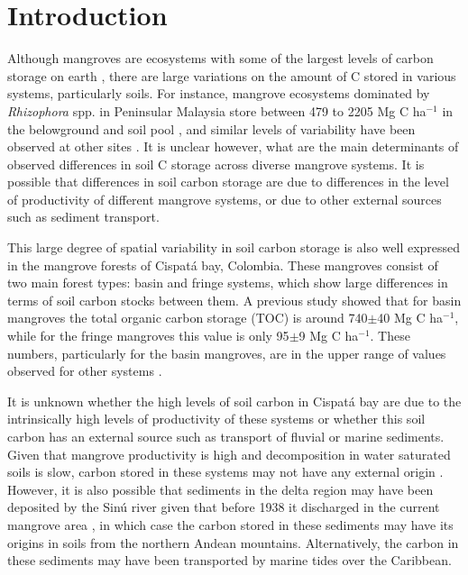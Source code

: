 \section{Introduction}
\label{intro}
Although mangroves are ecosystems with some of the largest levels of carbon storage on earth \citep{Donato2011, Alongi2012}, there are  large variations on the amount of C stored in various systems, particularly soils. For instance, mangrove ecosystems dominated by \emph{Rhizophora} spp. in Peninsular Malaysia store between 479 to 2205 Mg C ha$^{-1}$ in the belowground and soil pool \citep{Alongi2012}, and similar levels of variability have been observed at other sites \citep{Jardine2014}. It is unclear however, what are the main determinants of observed differences in soil C storage across diverse mangrove systems. It is possible that differences in soil carbon storage are due to differences in the level of productivity of different mangrove systems, or due to other external sources such as sediment transport. 

This large degree of spatial variability in soil carbon storage is also well expressed in the mangrove forests of Cispat\'{a} bay, Colombia. These mangroves consist of two main forest types: basin and fringe systems, 
which show large differences in terms of soil carbon stocks between them. A previous study \citep{Bolivar2015} showed that for basin mangroves the total organic carbon storage (TOC) is around 740$\pm$40 Mg C ha$^{-1}$, while for the fringe mangroves this value is only 95$\pm$9 Mg C ha$^{-1}$. These numbers, particularly for the basin mangroves, are in the upper range of values observed for other systems \citep{Donato2011, Alongi2012, Jardine2014}. 

It is unknown whether the high levels of soil carbon in Cispat\'{a} bay are due to the intrinsically high levels of productivity of these systems or whether this soil carbon has an external source such as transport of fluvial or marine sediments.  Given that mangrove productivity is high and decomposition in water saturated soils is slow, carbon stored in these systems may not have any external origin \citep{lacerda}. However, it is also possible that sediments in the delta region may have been deposited by the Sin\'u river given that before 1938 it discharged in the current mangrove area \citep{suarez2004}, in which case the carbon stored in these sediments may have its origins in soils from the northern Andean mountains.  Alternatively, the carbon in these sediments may have been transported by marine tides over the Caribbean. 

